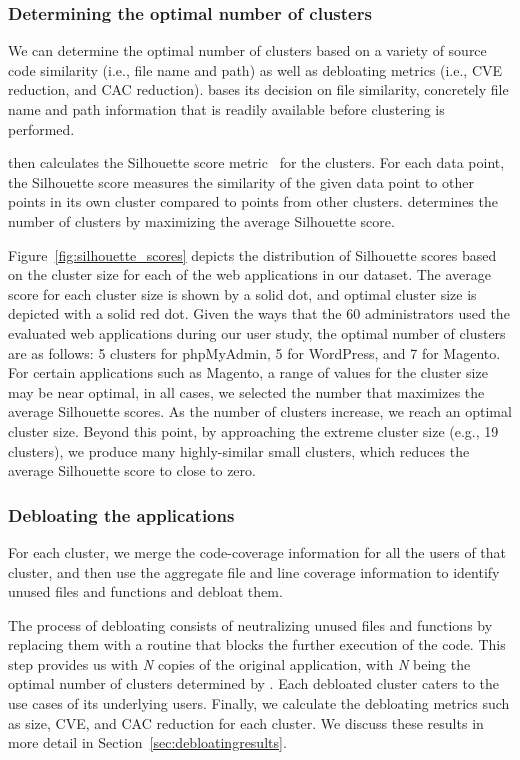 \subsubsection{Determining the optimal number of clusters} 
\label{sec:num-clusters}

We can determine the optimal number of clusters based on a variety of source code similarity (i.e., file name and path) as well as debloating metrics (i.e., CVE reduction, and CAC reduction). 
\dbltr{} bases its decision on file similarity, concretely file name and path information that is readily available before clustering is performed. 

\dbltr{} then calculates the Silhouette score metric~\cite{kaufman2009finding} for the clusters. 
For each data point, the Silhouette score measures the similarity of the given data point to other points in its own cluster compared to points from other clusters. 
\dbltr{} determines the number of clusters by maximizing the average Silhouette score. 

Figure~\ref{fig:silhouette_scores} depicts the distribution of Silhouette scores based on the cluster size for each of the web applications in our dataset. 
The average score for each cluster size is shown by a solid dot, and optimal cluster size is depicted with a solid red dot. 
Given the ways that the 60 administrators used the evaluated web applications during our user study, the optimal number of clusters are as follows: 5 clusters for phpMyAdmin, 5 for WordPress, and 7 for Magento. 
For certain applications such as Magento, a range of values for the cluster size may be near optimal, in all cases, we selected the number that maximizes the average Silhouette scores.
As the number of clusters increase, we reach an optimal cluster size. 
Beyond this point, by approaching the extreme cluster size (e.g., 19 clusters), we produce many highly-similar small clusters, which reduces the average Silhouette score to close to zero. 

\subsubsection{Debloating the applications} For each cluster, we merge the code-coverage information for all the users of that cluster, and then use the aggregate file and line coverage information to identify unused files and functions and debloat them. 

The process of debloating consists of neutralizing unused files and functions by replacing them with a routine that blocks the further execution of the code. 
This step provides us with \emph{N} copies of the original application, with \emph{N} being the optimal number of clusters determined by \dbltr{}. 
Each debloated cluster caters to the use cases of its underlying users. 
Finally, we calculate the debloating metrics such as size, CVE, and CAC reduction for each cluster. 
We discuss these results in more detail in Section~\ref{sec:debloatingresults}.

